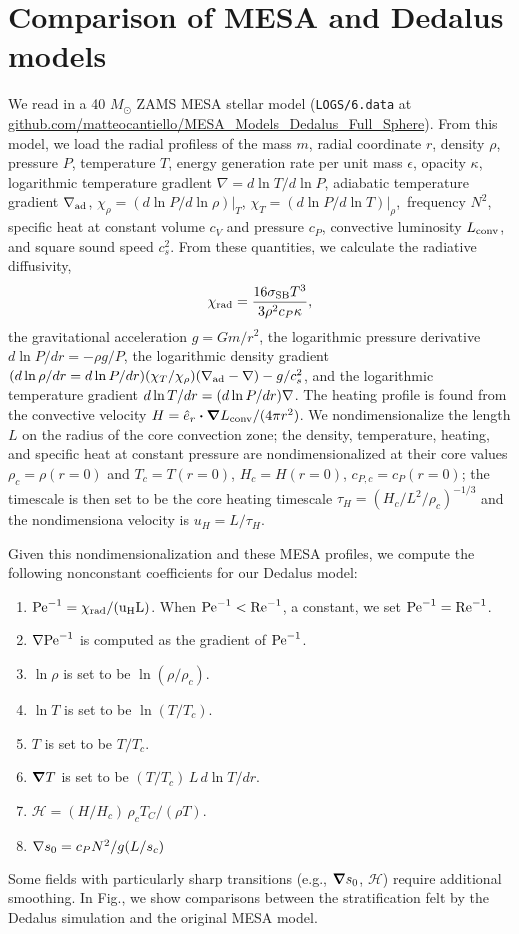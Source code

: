 \section{Comparison of MESA and Dedalus models}
\label{app:mesa_dedalus}
We read in a 40 $M_\odot$ ZAMS MESA stellar model (\texttt{LOGS/6.data} at \url{github.com/matteocantiello/MESA_Models_Dedalus_Full_Sphere}).
From this model, we load the radial profiless of the mass $m$, radial coordinate $r$, density $\rho$, pressure $P$, temperature $T$, energy generation rate per unit mass $\epsilon$, opacity $\kappa$, logarithmic temperature gradlent $\nabla = d \ln T/d \ln P$, adiabatic temperature gradient $\nabla_{\rm{ad}}$, $\chi_{\rho} = (d\ln P /d\ln\rho)|_T$, $\chi_T = (d\ln P/d\ln T)|_{\rho}$, \brunt$\,$frequency $N^2$, specific heat at constant volume $c_V$ and pressure $c_P$, convective luminosity $L_{\rm{conv}}$, and square sound speed $c_s^2$.
From these quantities, we calculate the radiative diffusivity,
\begin{equation}
\chi_{\rm{rad}} = \frac{16 \sigma_{\rm{SB}} T^3}{3 \rho^2 c_P \kappa},
\end{equation}
the gravitational acceleration $g = G m / r^2$, the logarithmic pressure derivative $d\ln P/dr = - \rho g /P$, the logarithmic density gradient $(d\ln\rho/dr = d\ln P/dr)(\chi_T/\chi_{\rho})(\nabla_{\rm{ad}} - \nabla) - g/c_s^2$, and the logarithmic temperature gradient $d\ln T/dr = (d\ln P/dr)\nabla$.
The heating profile is found from the convective velocity $H = \hat{e}_r\boldsymbol{\cdot}\boldsymbol{\nabla} L_{\rm{conv}} / (4\pi r^2)$.
We nondimensionalize the length $L$ on the radius of the core convection zone; the density, temperature, heating, and specific heat at constant pressure are nondimensionalized at their core values $\rho_c = \rho(r=0)$ and $T_c = T(r=0)$, $H_c = H(r=0)$, $c_{P,c} = c_P(r=0)$; the timescale is then set to be the core heating timescale $\tau_H = (H_c / L^2 / \rho_c)^{-1/3}$ and the nondimensiona velocity is $u_H = L / \tau_H$.

Given this nondimensionalization and these MESA profiles, we compute the following nonconstant coefficients for our Dedalus model:
\begin{enumerate}
\item $\rm{Pe}^{-1} = \chi_{\rm{rad}} / (u_H L)$. When $\rm{Pe}^{-1} < \rm{Re}^{-1}$, a constant, we set $\rm{Pe}^{-1} = \rm{Re}^{-1}$.
\item $\nabla\rm{Pe}^{-1}$ is computed as the gradient of $\rm{Pe}^{-1}$.
\item $\ln\rho$ is set to be $\ln(\rho / \rho_c)$.
\item $\ln T$ is set to be $\ln(T / T_c)$.
\item $T$ is set to be $T/T_c$.
\item $\boldsymbol{\nabla} T$ is set to be $(T/T_c)\,L\,d\ln T/dr$.
\item $\mathcal{H} = (H/H_c)\, \rho_c T_C / (\rho T)$.
\item $\nabla s_0 = c_P N^2 / g (L/s_c)$
\end{enumerate}

Some fields with particularly sharp transitions (e.g., $\boldsymbol{\nabla} s_0$, $\mathcal{H}$) require additional smoothing.
In Fig., we show comparisons between the stratification felt by the Dedalus simulation and the original MESA model.

